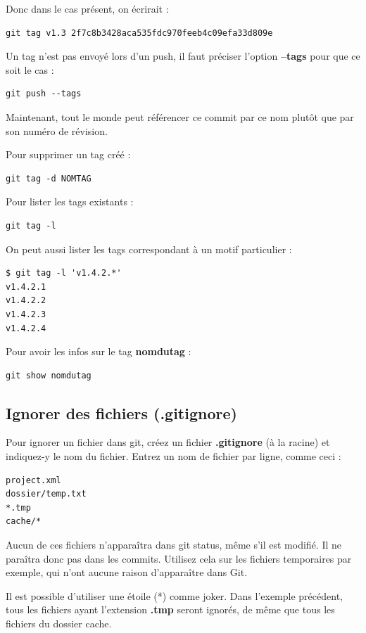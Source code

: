 \documentclass[a4paper,twoside]{article}
\begin{document}
Donc dans le cas présent, on écrirait :
\begin{verbatim}
git tag v1.3 2f7c8b3428aca535fdc970feeb4c09efa33d809e
\end{verbatim}

Un tag n'est pas envoyé lors d'un push, il faut préciser l'option \textbf{--tags} pour que ce soit le cas :
\begin{verbatim}
git push --tags
\end{verbatim}

Maintenant, tout le monde peut référencer ce commit par ce nom plutôt que par son numéro de révision.

\bigskip

Pour supprimer un tag créé :
\begin{verbatim}
git tag -d NOMTAG
\end{verbatim}

\bigskip

Pour lister les tags existants :
\begin{verbatim}
git tag -l
\end{verbatim}

On peut aussi lister les tags correspondant à un motif particulier : 
\begin{verbatim}
$ git tag -l 'v1.4.2.*'
v1.4.2.1
v1.4.2.2
v1.4.2.3
v1.4.2.4
\end{verbatim}

\bigskip

Pour avoir les infos sur le tag \textbf{nomdutag} : 
\begin{verbatim}
git show nomdutag
\end{verbatim}



\subsection{Ignorer des fichiers (.gitignore)}
Pour ignorer un fichier dans git, créez un fichier \textbf{.gitignore} (à la racine) et indiquez-y le nom du fichier. Entrez un nom de fichier par ligne, comme ceci :
\begin{verbatim}
project.xml
dossier/temp.txt
*.tmp
cache/*
\end{verbatim}
Aucun de ces fichiers n'apparaîtra dans git status, même s'il est modifié. Il ne paraîtra donc pas dans les commits.
Utilisez cela sur les fichiers temporaires par exemple, qui n'ont aucune raison d'apparaître dans Git.

Il est possible d'utiliser une étoile (*) comme joker. Dans l'exemple précédent, tous les fichiers ayant l'extension \textbf{.tmp} seront ignorés, de même que tous les fichiers du dossier cache.
\end{document}
